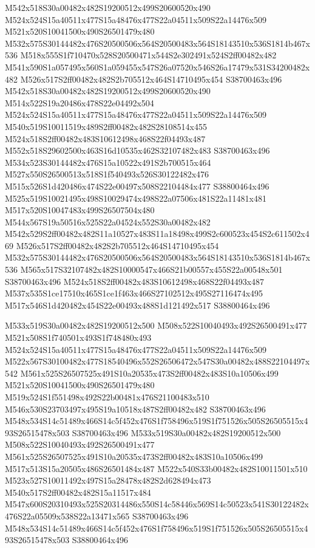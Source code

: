 \documentclass{article}
\begin{document}
\begin{multicols}{2}
M542x518S30a00482x482S19200512x499S20600520x490 M524x524S15a40511x477S15a48476x477S22a04511x509S22a14476x509 M521x520S10041500x490S26501479x480 M532x575S30144482x476S20500506x564S20500483x564S18143510x536S1814b467x536 M518x555S1f710470x528S20500471x544S2e302491x524S2ff00482x482 M541x590S1a057495x560S1a059455x547S26a07520x546S26a17479x531S34200482x482 M526x517S2ff00482x482S2b705512x464S14710495x454 S38700463x496 M542x518S30a00482x482S19200512x499S20600520x490 M514x522S19a20486x478S22e04492x504 M524x524S15a40511x477S15a48476x477S22a04511x509S22a14476x509 M540x519S10011519x489S2ff00482x482S28108514x455 M524x518S2ff00482x483S10612498x468S22f04493x487 M552x518S29602500x463S16d10535x462S32107482x483 S38700463x496 M534x523S30144482x476S15a10522x491S2b700515x464 M527x550S26500513x518S1f540493x526S30122482x476 M515x526S1d420486x474S22e00497x508S22104484x477 S38800464x496 M525x519S10021495x498S10029474x498S22a07506x481S22a11481x481 M517x520S10047483x499S26507504x480 M544x567S19a50516x525S22a04524x552S30a00482x482 M542x529S2ff00482x482S11a10527x483S11a18498x499S2c600523x454S2c611502x469 M526x517S2ff00482x482S2b705512x464S14710495x454 M532x575S30144482x476S20500506x564S20500483x564S18143510x536S1814b467x536 M565x517S32107482x482S10000547x466S21b00557x455S22a00548x501 S38700463x496 M524x518S2ff00482x483S10612498x468S22f04493x487 M537x535S1ce17510x465S1ce1f463x466S27102512x495S27116474x495 M517x546S1d420482x454S22e00493x488S1d121492x517 S38800464x496

M533x519S30a00482x482S19200512x500 M508x522S10040493x492S26500491x477 M521x508S1f740501x493S1f748480x493 M524x524S15a40511x477S15a48476x477S22a04511x509S22a14476x509 M522x567S30100482x477S18540496x552S26506472x547S30a00482x488S22104497x542 M561x525S26507525x491S10a20535x473S2ff00482x483S10a10506x499 M521x520S10041500x490S26501479x480 M519x524S1f551498x492S22b00481x476S21100483x510 M546x530S23703497x495S19a10518x487S2ff00482x482 S38700463x496 M548x534S14c51489x466S14c5f452x476S1f758496x519S1f751526x505S26505515x493S26515478x503 S38700463x496 M533x519S30a00482x482S19200512x500 M508x522S10040493x492S26500491x477 M561x525S26507525x491S10a20535x473S2ff00482x483S10a10506x499 M517x513S15a20505x486S26501484x487 M522x540S33b00482x482S10011501x510 M523x527S10011492x497S15a28478x482S2d628494x473 M540x517S2ff00482x482S15a11517x484 M547x600S20310493x525S20314486x550S14c58446x569S14c50523x541S30122482x476S22a05509x538S22a13471x565 S38700463x496 M548x534S14c51489x466S14c5f452x476S1f758496x519S1f751526x505S26505515x493S26515478x503 S38800464x496


\end{multicols}
\end{document}
